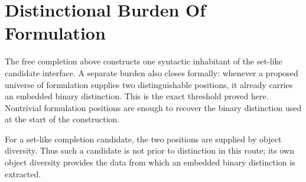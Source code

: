 \documentclass[11pt]{article}
\begin{document}
\section{Distinctional Burden Of Formulation}

The free completion above constructs one syntactic inhabitant of the
set-like candidate interface.  A separate burden also closes formally:
whenever a proposed universe of formulation supplies two distinguishable
positions, it already carries an embedded binary distinction.  This is
the exact threshold proved here.  Nontrivial formulation positions are
enough to recover the binary distinction used at the start of the
construction.

For a set-like completion candidate, the two positions are supplied by
object diversity.  Thus such a candidate is not prior to distinction in
this route; its own object diversity provides the data from which an
embedded binary distinction is extracted.
\end{document}
